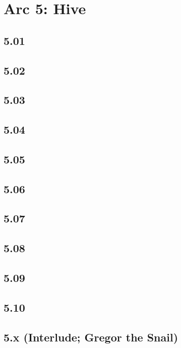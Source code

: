 \part{Arc 5: Hive}
 \chapter{5.01}
 \chapter{5.02}
 \chapter{5.03}
 \chapter{5.04}
 \chapter{5.05}
 \chapter{5.06}
 \chapter{5.07}
 \chapter{5.08}
 \chapter{5.09}
 \chapter{5.10}
 \chapter{5.x (Interlude; Gregor the Snail)}












